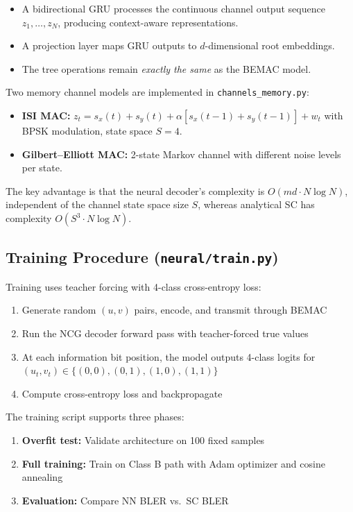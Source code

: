 \documentclass[11pt,a4paper]{article}
\begin{document}
\begin{itemize}
  \item A bidirectional GRU processes the continuous channel output sequence
        $z_1, \ldots, z_N$, producing context-aware representations.
  \item A projection layer maps GRU outputs to $d$-dimensional root embeddings.
  \item The tree operations remain \emph{exactly the same} as the BEMAC model.
\end{itemize}

Two memory channel models are implemented in \texttt{channels\_memory.py}:
\begin{itemize}
  \item \textbf{ISI MAC:} $z_t = s_x(t) + s_y(t) + \alpha [s_x(t{-}1) + s_y(t{-}1)] + w_t$ with BPSK modulation, state space $S = 4$.
  \item \textbf{Gilbert--Elliott MAC:} 2-state Markov channel with different noise levels per state.
\end{itemize}

The key advantage is that the neural decoder's complexity is $O(md \cdot N \log N)$, independent of the channel state space size $S$, whereas analytical SC has complexity $O(S^3 \cdot N \log N)$.

\subsection{Training Procedure (\texttt{neural/train.py})}

Training uses teacher forcing with 4-class cross-entropy loss:
\begin{enumerate}
  \item Generate random $(u, v)$ pairs, encode, and transmit through BEMAC
  \item Run the NCG decoder forward pass with teacher-forced true values
  \item At each information bit position, the model outputs 4-class logits
        for $(u_t, v_t) \in \{(0,0), (0,1), (1,0), (1,1)\}$
  \item Compute cross-entropy loss and backpropagate
\end{enumerate}

The training script supports three phases:
\begin{enumerate}
  \item \textbf{Overfit test:} Validate architecture on 100 fixed samples
  \item \textbf{Full training:} Train on Class B path with Adam optimizer and cosine annealing
  \item \textbf{Evaluation:} Compare NN BLER vs.\ SC BLER
\end{enumerate}
\end{document}
